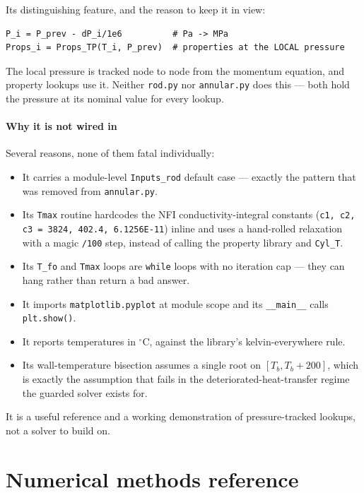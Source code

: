 \documentclass[11pt]{article}
\newcommand{\code}[1]{\texttt{#1}}
\begin{document}
Its distinguishing feature, and the reason to keep it in view:
\begin{lstlisting}
P_i = P_prev - dP_i/1e6          # Pa -> MPa
Props_i = Props_TP(T_i, P_prev)  # properties at the LOCAL pressure
\end{lstlisting}
The local pressure is tracked node to node from the momentum equation, and property
lookups use it. Neither \code{rod.py} nor \code{annular.py} does this --- both hold the
pressure at its nominal value for every lookup.

\subsection{Why it is not wired in}
Several reasons, none of them fatal individually:
\begin{itemize}
\item It carries a module-level \code{Inputs\_rod} default case --- exactly the pattern
      that was removed from \code{annular.py}.
\item Its \code{Tmax} routine hardcodes the NFI conductivity-integral constants
      (\code{c1, c2, c3 = 3824, 402.4, 6.1256E-11}) inline and uses a hand-rolled
      relaxation with a magic \code{/100} step, instead of calling the property library
      and \code{Cyl\_T}.
\item Its \code{T\_fo} and \code{Tmax} loops are \code{while} loops with no iteration
      cap --- they can hang rather than return a bad answer.
\item It imports \code{matplotlib.pyplot} at module scope and its \code{\_\_main\_\_}
      calls \code{plt.show()}.
\item It reports temperatures in $^\circ$C, against the library's kelvin-everywhere rule.
\item Its wall-temperature bisection assumes a single root on $[T_b, T_b+200]$, which is
      exactly the assumption that fails in the deteriorated-heat-transfer regime the
      guarded solver exists for.
\end{itemize}

It is a useful reference and a working demonstration of pressure-tracked lookups, not a
solver to build on.

\newpage
\part{Numerical methods reference}
\end{document}

